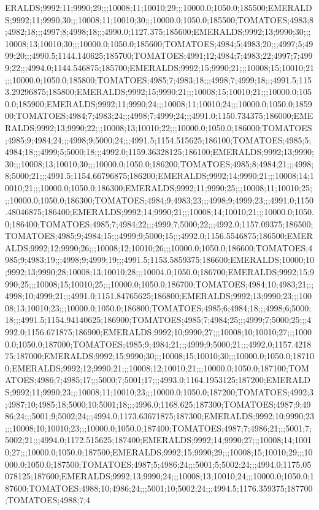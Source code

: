ERALDS;9992;11;9990;29;;;10008;11;10010;29;;;10000.0;1050.0;185500;EMERALDS;9992;11;9990;30;;;10008;11;10010;30;;;10000.0;1050.0;185500;TOMATOES;4983;8;4982;18;;;4997;8;4998;18;;;4990.0;1127.375;185600;EMERALDS;9992;13;9990;30;;;10008;13;10010;30;;;10000.0;1050.0;185600;TOMATOES;4984;5;4983;20;;;4997;5;4999;20;;;4990.5;1144.140625;185700;TOMATOES;4991;12;4984;7;4983;22;4997;7;4999;22;;;4994.0;1144.546875;185700;EMERALDS;9992;15;9990;21;;;10008;15;10010;21;;;10000.0;1050.0;185800;TOMATOES;4985;7;4983;18;;;4998;7;4999;18;;;4991.5;1153.29296875;185800;EMERALDS;9992;15;9990;21;;;10008;15;10010;21;;;10000.0;1050.0;185900;EMERALDS;9992;11;9990;24;;;10008;11;10010;24;;;10000.0;1050.0;185900;TOMATOES;4984;7;4983;24;;;4998;7;4999;24;;;4991.0;1150.734375;186000;EMERALDS;9992;13;9990;22;;;10008;13;10010;22;;;10000.0;1050.0;186000;TOMATOES;4985;9;4984;24;;;4998;9;5000;24;;;4991.5;1154.515625;186100;TOMATOES;4985;5;4984;18;;;4999;5;5000;18;;;4992.0;1159.36328125;186100;EMERALDS;9992;13;9990;30;;;10008;13;10010;30;;;10000.0;1050.0;186200;TOMATOES;4985;8;4984;21;;;4998;8;5000;21;;;4991.5;1154.66796875;186200;EMERALDS;9992;14;9990;21;;;10008;14;10010;21;;;10000.0;1050.0;186300;EMERALDS;9992;11;9990;25;;;10008;11;10010;25;;;10000.0;1050.0;186300;TOMATOES;4984;9;4983;23;;;4998;9;4999;23;;;4991.0;1150.48046875;186400;EMERALDS;9992;14;9990;21;;;10008;14;10010;21;;;10000.0;1050.0;186400;TOMATOES;4985;7;4984;22;;;4999;7;5000;22;;;4992.0;1157.09375;186500;TOMATOES;4985;9;4984;15;;;4999;9;5000;15;;;4992.0;1156.5546875;186500;EMERALDS;9992;12;9990;26;;;10008;12;10010;26;;;10000.0;1050.0;186600;TOMATOES;4985;9;4983;19;;;4998;9;4999;19;;;4991.5;1153.5859375;186600;EMERALDS;10000;10;9992;13;9990;28;10008;13;10010;28;;;10004.0;1050.0;186700;EMERALDS;9992;15;9990;25;;;10008;15;10010;25;;;10000.0;1050.0;186700;TOMATOES;4984;10;4983;21;;;4998;10;4999;21;;;4991.0;1151.84765625;186800;EMERALDS;9992;13;9990;23;;;10008;13;10010;23;;;10000.0;1050.0;186800;TOMATOES;4985;6;4984;18;;;4998;6;5000;18;;;4991.5;1154.94140625;186900;TOMATOES;4985;7;4984;25;;;4999;7;5000;25;;;4992.0;1156.671875;186900;EMERALDS;9992;10;9990;27;;;10008;10;10010;27;;;10000.0;1050.0;187000;TOMATOES;4985;9;4984;21;;;4999;9;5000;21;;;4992.0;1157.421875;187000;EMERALDS;9992;15;9990;30;;;10008;15;10010;30;;;10000.0;1050.0;187100;EMERALDS;9992;12;9990;21;;;10008;12;10010;21;;;10000.0;1050.0;187100;TOMATOES;4986;7;4985;17;;;5000;7;5001;17;;;4993.0;1164.1953125;187200;EMERALDS;9992;11;9990;23;;;10008;11;10010;23;;;10000.0;1050.0;187200;TOMATOES;4992;3;4987;10;4985;18;5000;10;5001;18;;;4996.0;1168.625;187300;TOMATOES;4987;9;4986;24;;;5001;9;5002;24;;;4994.0;1173.63671875;187300;EMERALDS;9992;10;9990;23;;;10008;10;10010;23;;;10000.0;1050.0;187400;TOMATOES;4987;7;4986;21;;;5001;7;5002;21;;;4994.0;1172.515625;187400;EMERALDS;9992;14;9990;27;;;10008;14;10010;27;;;10000.0;1050.0;187500;EMERALDS;9992;15;9990;29;;;10008;15;10010;29;;;10000.0;1050.0;187500;TOMATOES;4987;5;4986;24;;;5001;5;5002;24;;;4994.0;1175.05078125;187600;EMERALDS;9992;13;9990;24;;;10008;13;10010;24;;;10000.0;1050.0;187600;TOMATOES;4988;10;4986;24;;;5001;10;5002;24;;;4994.5;1176.359375;187700;TOMATOES;4988;7;4